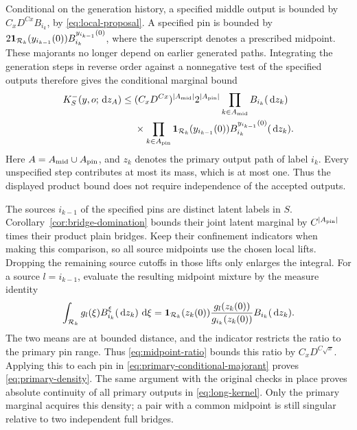 Conditional on the generation history, a specified middle output
is bounded by $C_xD^{Cx}B_{i_k}$, by
\eqref{eq:local-proposal}.  A specified pin is bounded by
$2\mathbf 1_{\mathcal R_k}(y_{i_{k-1}}(0))
B_{i_k}^{y_{i_{k-1}}(0)}$, where the superscript denotes a prescribed
midpoint.  These majorants no longer depend on earlier generated
paths.  Integrating the generation steps in reverse order against
a nonnegative test of the specified outputs therefore gives the
conditional marginal bound
\begin{equation}\label{eq:primary-conditional-majorant}
\begin{split}
 K_S^-(y,o;\,\mathrm d z_A)\le{}&
 (C_xD^{Cx})^{|A_{\rm mid}|}2^{|A_{\rm pin}|}
 \prod_{k\in A_{\rm mid}}B_{i_k}(\,\mathrm d z_k)\\
 &\times\prod_{k\in A_{\rm pin}}
 \mathbf 1_{\mathcal R_k}(y_{i_{k-1}}(0))
 B_{i_k}^{y_{i_{k-1}}(0)}(\,\mathrm d z_k).
\end{split}
\end{equation}
Here $A=A_{\rm mid}\cup A_{\rm pin}$, and $z_k$ denotes the primary
output path of label $i_k$.  Every unspecified step contributes at
most its mass, which is at most one.  Thus the displayed product
bound does not require independence of the accepted outputs.

The sources $i_{k-1}$ of the specified pins are distinct latent labels
in $S$.  Corollary~\ref{cor:bridge-domination} bounds their joint
latent marginal by $C^{|A_{\rm pin}|}$ times their product plain
bridges.  Keep their confinement indicators when making this
comparison, so all source midpoints use the chosen local lifts.
Dropping the remaining source cutoffs in those lifts only enlarges
the integral.  For a source $l=i_{k-1}$, evaluate the resulting
midpoint mixture by the measure identity
\begin{equation}\label{eq:pin-mixture-density}
 \int_{\mathcal R_k}g_l(\xi)B_{i_k}^{\xi}(\,\mathrm d z_k)\,\,\mathrm d\xi
 =\mathbf 1_{\mathcal R_k}(z_k(0))
   \frac{g_l(z_k(0))}{g_{i_k}(z_k(0))}
       B_{i_k}(\,\mathrm d z_k).
\end{equation}
The two means are at bounded distance, and the indicator restricts
the ratio to the primary pin range.  Thus
\eqref{eq:midpoint-ratio} bounds this ratio by
$C_xD^{C\sqrt x}$.  Applying this to each pin in
\eqref{eq:primary-conditional-majorant} proves
\eqref{eq:primary-density}.  The same argument with the original
checks in place proves absolute continuity of all primary outputs
in \eqref{eq:long-kernel}.  Only the primary marginal acquires this
density; a pair with a common midpoint is still singular relative
to two independent full bridges.

